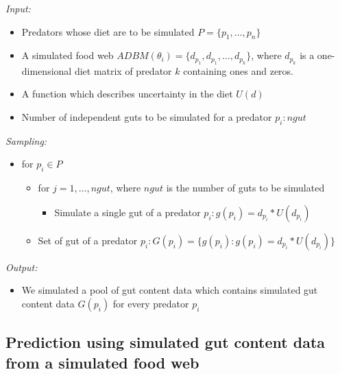 \documentclass{article}
\begin{document}
\emph{Input:}

\begin{itemize}
\item
  Predators whose diet are to be simulated \(P = \{p_1, \dots, p_n\}\)
\item
  A simulated food web
  \(ADBM(\theta_i) = \{d_{p_1}, d_{p_1}, \dots, d_{p_k}\}\), where
  \(d_{p_k}\) is a one-dimensional diet matrix of predator \(k\)
  containing ones and zeros.
\item
  A function which describes uncertainty in the diet \(U(d)\)
\item
  Number of independent guts to be simulated for a predator
  \(p_i: ngut\)
\end{itemize}

\emph{Sampling:}

\begin{itemize}
\item
  for \(p_i \in P\)

  \begin{itemize}
  \item
    for \(j = 1, \dots, ngut\), where \(ngut\) is the number of guts to
    be simulated

    \begin{itemize}
    \tightlist
    \item
      Simulate a single gut of a predator
      \(p_i: g(p_i) = d_{p_i} * U(d_{p_i})\)
    \end{itemize}
  \item
    Set of gut of a predator
    \(p_i: G(p_i) = \{ g(p_i) : g(p_i) = d_{p_i}*U(d_{p_i}) \}\)
  \end{itemize}
\end{itemize}

\emph{Output:}

\begin{itemize}
\tightlist
\item
  We simulated a pool of gut content data which contains simulated gut
  content data \(G(p_i)\) for every predator \(p_i\)
\end{itemize}

\hypertarget{prediction-using-simulated-gut-content-data-from-a-simulated-food-web}{%
\subsection{Prediction using simulated gut content data from a simulated
food
web}\label{prediction-using-simulated-gut-content-data-from-a-simulated-food-web}}
\end{document}
